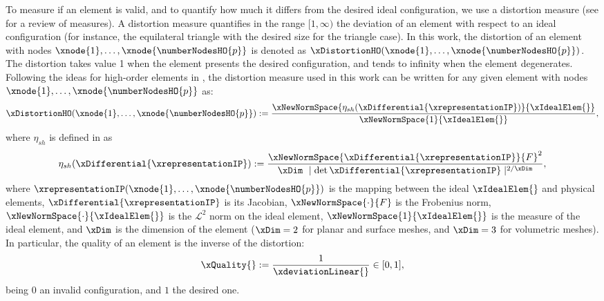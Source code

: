 \documentclass[1p]{elsarticle}
\begin{document}
To measure if an element is valid, and to quantify how much it differs from the desired ideal configuration, we use a distortion measure (see  \cite{knupp:algebraicQualityInitialMeshes} for a review of measures). 
A distortion measure quantifies in the range $[1,\infty)$ the deviation of an element with respect to an ideal configuration  (for instance, the equilateral triangle with the desired size for the triangle case). 
In this work, the distortion of an element with nodes $\xnode{1},\ldots,\xnode{\numberNodesHO{p}}$ is denoted as $\xDistortionHO(\xnode{1},\ldots,\xnode{\numberNodesHO{p}})$. 
The distortion takes value 1 when the element presents the desired configuration, and tends to infinity when the element degenerates.  
Following the ideas for high-order elements in \cite{gargallo:generation3Doptimization,AGPXRNJPGJSR:IMR13ewc},
the distortion measure used in this work can be written for any given element with nodes $\xnode{1},\ldots,\xnode{\numberNodesHO{p}}$ as:
\begin{equation}
\xDistortionHO(\xnode{1},\ldots,\xnode{\numberNodesHO{p}})
:=
{
	\frac{
		\xNewNormSpace{
			\eta_{sh}(
			\xDifferential{\xrepresentationIP}
			)
		}{\xIdealElem{}}
	}
	{
		\xNewNormSpace{1}{\xIdealElem{}}
	}
},
\label{eq:distortionElementGeneral}
\end{equation}
where  $\eta_{sh}$ is defined in \cite{knupp:algebraicQualityInitialMeshes} as 
\begin{equation*}
	\eta_{sh}(
	\xDifferential{\xrepresentationIP}
	):= 
	\frac
	{\xNewNormSpace{\xDifferential{\xrepresentationIP} }{F}^2}
	{\xDim\ \mid{\det\xDifferential{\xrepresentationIP} }\mid^{2/\xDim}},
\end{equation*}
where
$\xrepresentationIP(\xnode{1},\ldots,\xnode{\numberNodesHO{p}})$ is the mapping between the ideal $ \xIdealElem{} $ and physical elements,
$\xDifferential{\xrepresentationIP}$ is its Jacobian,
$\xNewNormSpace{\cdot}{F}$ is the Frobenius norm,
$\xNewNormSpace{\cdot}{\xIdealElem{}}$ is the $\mathcal{L}^2$ norm on the ideal element, 
$\xNewNormSpace{1}{\xIdealElem{}}$ is the measure of the ideal element,
and $\xDim$ is the dimension of the element ($\xDim=2$ for planar and surface meshes, and $\xDim=3$ for volumetric meshes).
In particular, the quality of an element is the inverse of the distortion:
\begin{equation}
\label{eq:quality}
\xQuality{}:=\frac{1}{\xdeviationLinear{}}\in[0,1],
\end{equation}
being 0 an invalid configuration, and $1$ the desired one.
\end{document}
